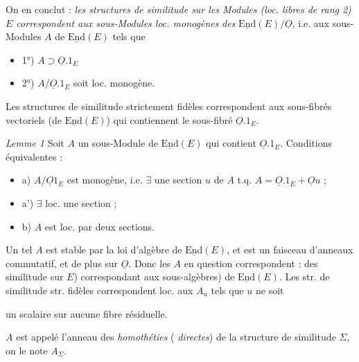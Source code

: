 \documentclass[11pt,a4paper]{article}
\begin{document}
On en conclut : \emph{les structures de similitude sur les Modules (loc. libres de rang 2) $E$ correspondent aux sous-Modules loc. monogènes}  \emph{des} $\underline{\mathrm{End}}(E)/\underline{O}$, i.e. aux sous-Modules $A$ de $\underline{\mathrm{End}}(E)$ tels que
\begin{itemize}
  \item 1°) $A \supset \underline{O}.1_E$
  \item 2°) $A/\underline{O}.1_E$ soit loc. monogène.
\end{itemize}
Les structures de similitude strictement fidèles correspondent aux sous-fibrés vectoriels  (de $\underline{\mathrm{End}}(E)$) qui contiennent le sous-fibré $\underline{O}.1_E$.

\emph{Lemme 1} Soit $A$ un sous-Module de $\underline{\mathrm{End}}(E)$ qui contient $\underline{O}.1_E$. Conditions équivalentes :
\begin{itemize}
  \item a) $A/\underline{O}1_E$ est monogène, i.e. $\exists$ une section $u$ de $A$ t.q. $A = \underline{O}.1_E + \underline{O}u$ ;
  \item a') $\exists$ loc. une section \ill{} ;
  \item b) $A$ est  loc. par deux sections.
\end{itemize}
Un tel $A$ est stable par la loi d'algèbre de $\underline{\mathrm{End}}(E)$, et est un faisceau d'anneaux commutatif, et de plus    sur $\underline{O}$. Donc les $A$ en question correspondent : des  similitude sur $E$) correspondant  aux sous-algèbres) de $\underline{\mathrm{End}}(E)$. Les str. de similitude str. fidèles correspondent loc. aux $A_u$  tels que $u$ ne soit

un scalaire sur aucune fibre résiduelle.

$A$ est appelé l'anneau des \emph{homothéties} ( \emph{directes})  de la structure de similitude $\Sigma$, on le note $A_\Sigma$.
\end{document}
